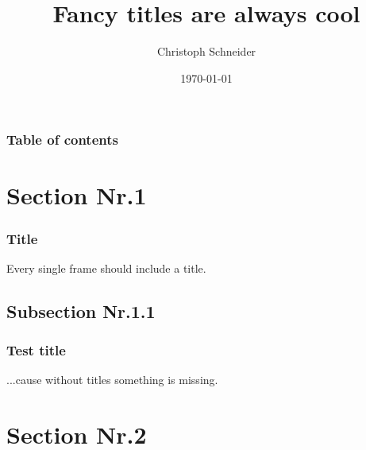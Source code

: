 \documentclass{beamer}	%
\begin{document}
\title{Fancy titles are always cool}   
\author{Christoph Schneider}
\date{\today}



\begin{frame}
\titlepage
\end{frame}

\begin{frame}
\frametitle{Table of contents}\tableofcontents
\end{frame}


\section{Section Nr.1} 
\begin{frame}\frametitle{Title} 
Every single frame should include a title.
\end{frame}

\subsection{Subsection Nr.1.1}
\begin{frame}\frametitle{Test title}
...cause without titles something is missing.
\end{frame}


\section{Section Nr.2} 
\end{document}
